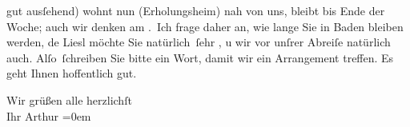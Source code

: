                gut ausſehend) wohnt nun (Erholungsheim) nah
               von uns, bleibt bis Ende der Woche; auch wir denken am \label{K_L04161-2v}\label{K_L04161-2}. Ich frage daher an, wie lange Sie in Baden bleiben werden, de{\geminationn}{ }Liesl möchte
               Sie natürlich ſehr \label{K_L04161-3v}\label{K_L04161-3}, u wir
               vor unſrer Abreiſe natürlich auch. Alſo ſchreiben Sie bitte ein Wort, damit wir ein
               Arrangement treffen. Es geht Ihnen hoffentlich gut.\pend
           
\pstart
           Wir grüßen alle herzlichſt{\\[\baselineskip]} Ihr \spacefill\mbox{Arthur}\pend
           \leftskip=0em{}\endnumbering{}
\begin{anhang}
\end{anhang}\newcommand{\dateiname}{L04161}\newcommand{\titel}{Arthur Schnitzler an Gustav Schwarzkopf, 1. 6. 1913}\newcommand{\editorInnen}{Herausgegeben von Jahnke, SelmaMüller, Martin Anton}
